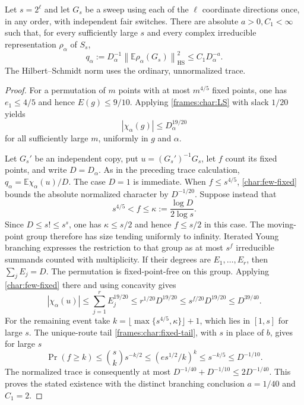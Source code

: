 \begin{lemma}\label{char:sweep-trace}
Let $s=2^\ell$ and let $G_s$ be a sweep using each of the $\ell$ coordinate
directions once, in any order, with independent fair switches. There are
absolute $a>0,C_1<\infty$ such that, for every sufficiently large $s$ and
every complex irreducible representation $\rho_\alpha$ of $S_s$,
\[
 q_\alpha:=D_\alpha^{-1}
  \left\|\mathbb E\rho_\alpha(G_s)\right\|_{\mathrm{HS}}^2
 \le C_1D_\alpha^{-a}.
\]
The Hilbert--Schmidt norm uses the ordinary, unnormalized trace.
\end{lemma}

\begin{proof}
For a permutation of $m$ points with at most $m^{4/5}$ fixed points,
one has $e_1\le4/5$ and hence $E(g)\le9/10$.
Applying \eqref{frames:char:LS} with slack $1/20$ yields
\begin{equation}\label{char:few-fixed}
 |\chi_\alpha(g)|\le D_\alpha^{19/20}
\end{equation}
for all sufficiently large $m$, uniformly in $g$ and $\alpha$.

Let $G_s'$ be an independent copy, put $u=(G_s')^{-1}G_s$, let $f$
count its fixed points, and write $D=D_\alpha$. As in the preceding
trace calculation, $q_\alpha=\mathbb E\chi_\alpha(u)/D$.
The case $D=1$ is immediate. When $f\le s^{4/5}$,
\eqref{char:few-fixed} bounds the absolute normalized character by
$D^{-1/20}$. Suppose instead that
\[
 s^{4/5}<f\le\kappa:=\frac{\log D}{2\log s}.
\]
Since $D\le s!\le s^s$, one has $\kappa\le s/2$ and hence $f\le s/2$
in this case. The moving-point group
therefore has size tending uniformly to infinity. Iterated Young
branching \cite[Theorem~9.2]{James1978} expresses the restriction to
that group as at most $s^f$ irreducible summands counted with
multiplicity. If their degrees are $E_1,\ldots,E_r$, then
$\sum_jE_j=D$. The permutation is fixed-point-free on this group.
Applying \eqref{char:few-fixed} there and using concavity gives
\[
 |\chi_\alpha(u)|
 \le\sum_{j=1}^r E_j^{19/20}
 \le r^{1/20}D^{19/20}
 \le s^{f/20}D^{19/20}
 \le D^{39/40}.
\]
For the remaining event take
$k=\lfloor\max\{s^{4/5},\kappa\}\rfloor+1$, which lies in $[1,s]$
for large $s$. The unique-route tail
\eqref{frames:char:fixed-tail}, with $s$ in place of $b$, gives for
large $s$
\[
 \Pr(f\ge k)\le\binom sk s^{-k/2}
 \le(e s^{1/2}/k)^k\le s^{-k/5}\le D^{-1/10}.
\]
The normalized trace is consequently at most
$D^{-1/40}+D^{-1/10}\le2D^{-1/40}$. This proves the stated existence
with the distinct branching conclusion $a=1/40$ and $C_1=2$.
\end{proof}

